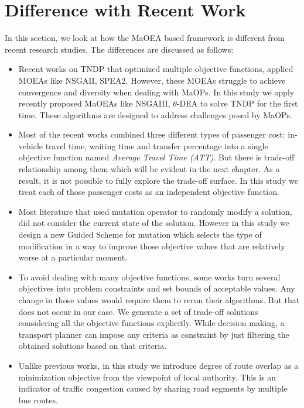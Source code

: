 \section{Difference with Recent Work}
In this section, we look at how the MaOEA based framework is different from recent research studies. The differences are discussed as follows:

\begin{itemize}
\item Recent works on TNDP that optimized multiple objective functions, applied MOEAs like NSGAII, SPEA2. However, these MOEAs struggle to achieve convergence and diversity when dealing with MaOPs. In this study we apply recently proposed MaOEAs like NSGAIII, $\theta$-DEA to solve TNDP for the first time. These algorithms are designed to address challenges posed by MaOPs.

\item Most of the recent works combined three different types of passenger cost: in-vehicle travel time, waiting time and transfer percentage into a single objective function named \textit{Average Travel Time (ATT)}. But there is trade-off relationship among them which will be evident in the next chapter. As a result, it is not possible to fully explore the trade-off surface. In this study we treat each of those passenger costs as an independent objective function.

\item Most literature that used mutation operator to randomly modify a solution, did not consider the current state of the solution. However in this study we design a new Guided Scheme for mutation which selects the type of modification in a way to improve those objective values that are relatively worse at a particular moment.

\item To avoid dealing with many objective functions, some works turn several objectives into problem constraints and set bounds of acceptable values. Any change in those values would require them to rerun their algorithms. But that does not occur in our case. We generate a set of trade-off solutions considering all the objective functions explicitly. While decision making, a transport planner can impose any criteria as constraint by just filtering the obtained solutions based on that criteria.

\item Unlike previous works, in this study we introduce degree of route overlap as a minimization objective from the viewpoint of local authority. This is an indicator of traffic congestion caused by sharing road segments by multiple bus routes.
\end{itemize}

